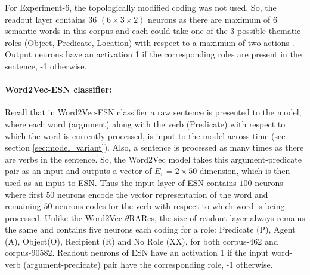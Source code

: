 For Experiment-6, the topologically modified coding was not used. So, the readout layer contains 36 $(6 \times 3 \times 2)$ neurons as there are maximum of 6 semantic words in this corpus and each could take one of the 3 possible thematic roles (Object, Predicate, Location) with respect to a maximum of two actions \cite{tra:xavier_hri}. Output neurons have an activation 1 if the corresponding roles are present in the sentence, -1 otherwise. 

\paragraph{Word2Vec-ESN classifier:}

Recall that in Word2Vec-ESN classifier a raw sentence is presented to the model, where each word (argument) along with the verb (Predicate) with respect to which the word is currently processed, is input to the model across time (see section \ref{sec:model_variant}). Also, a sentence is processed as many times as there are verbs in the sentence. So, the Word2Vec model takes this argument-predicate pair as an input and outputs a vector of $E_{v} = 2 \times 50$ dimension, which is then used as an input to ESN. Thus the input layer of ESN contains $100$ neurons where first $50$ neurons encode the vector representation of the word and remaining $50$ neurons codes for the verb with respect to which word is being processed. Unlike the Word2Vec-$\theta$RARes, the size of readout layer always remains the same and contains five neurons each coding for a role: Predicate (P), Agent (A), Object(O), Recipient (R) and No Role (XX), for both corpus-462 and corpus-90582. Readout neurons of ESN have an activation 1 if the input word-verb (argument-predicate) pair have the corresponding role, -1 otherwise.